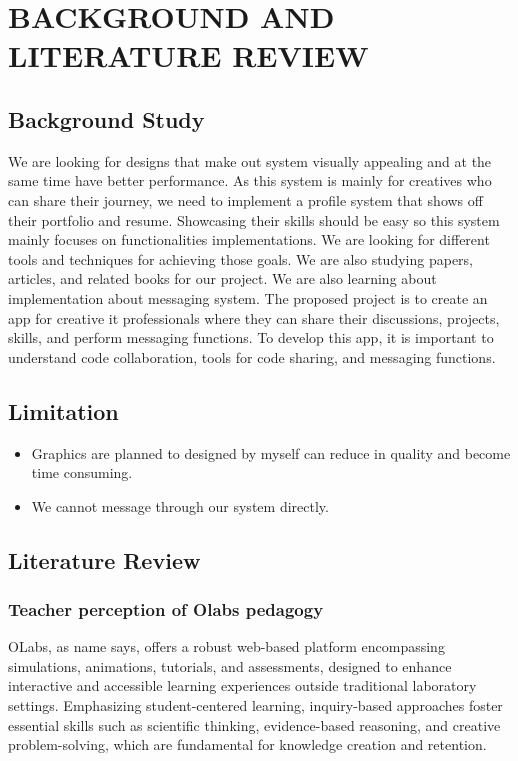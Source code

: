 \chapter{BACKGROUND AND LITERATURE REVIEW}





\section{Background Study}

We are looking for designs that make out system visually appealing and at the same time have better performance. As this system is mainly for creatives who can share their journey, we need to implement a profile system that shows off their portfolio and resume. Showcasing their skills should be easy so this system mainly focuses on functionalities implementations. We are looking for different tools and techniques for achieving those goals. We are also studying papers, articles, and related books for our project. We are also learning about implementation about messaging system.
The proposed project is to create an app for creative it professionals where they can share their discussions, projects, skills, and perform messaging functions. To develop this app, it is important to understand code collaboration, tools for code sharing, and messaging functions.
\section{Limitation}
\begin{itemize}
    \item Graphics are planned to designed by myself can reduce in quality and become time consuming.
    \item We cannot message through our system directly.
\end{itemize}
\section{Literature Review}
\subsection*{Teacher perception of Olabs pedagogy}
OLabs, as name says, offers a robust web-based platform encompassing simulations, animations, tutorials, and assessments, designed to enhance interactive and accessible learning experiences outside traditional laboratory settings. Emphasizing student-centered learning, inquiry-based approaches foster essential skills such as scientific thinking, evidence-based reasoning, and creative problem-solving, which are fundamental for knowledge creation and retention.\cite{chandrashekhar2020teacher}
